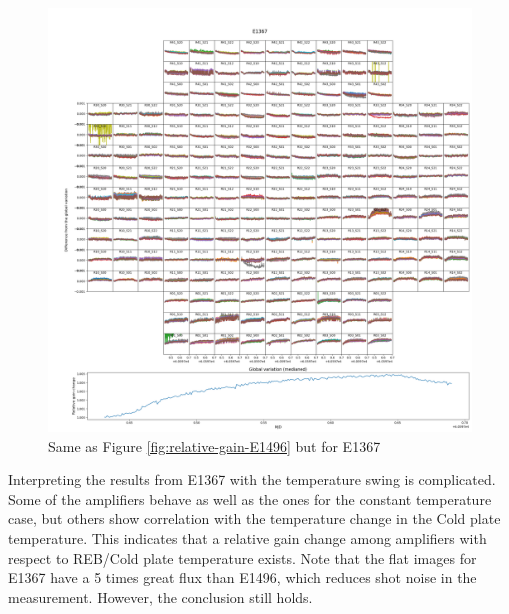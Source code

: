 \begin{figure}[ht]
    \centering
    \includegraphics[width=1\linewidth]{figures/gaintemp/E1367gainoverall_global.png}
    \caption{Same as Figure \ref{fig:relative-gain-E1496} but for E1367}
    \label{fig:relative-gain-E1367}
\end{figure} 
Interpreting the results from E1367 with the temperature swing is complicated. Some of the amplifiers behave as well as the ones for the constant temperature case, but others show correlation with the temperature change in the Cold plate temperature. This indicates that a relative gain change among amplifiers with respect to REB/Cold plate temperature exists. 
Note that the flat images for E1367 have a 5 times great flux than E1496, which reduces shot noise in the measurement. However, the conclusion still holds. 

